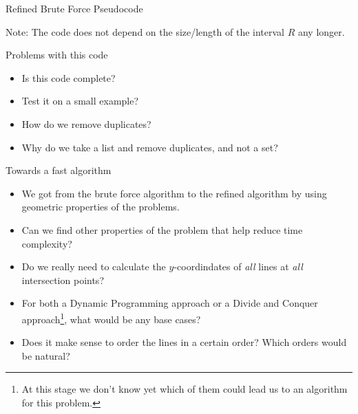 \documentclass[ignorenonframetext,]{beamer}
\begin{document}
\begin{frame}{Refined Brute Force Pseudocode}

\begin{algorithm}[H]
\caption{Refined Brute Force}
\begin{algorithmic}
          
        \EndFor
         
         
        \EndFor
         
    \EndProcedure
\end{algorithmic}
\end{algorithm}
Note: The code does not depend on the size/length of the interval $R$ any longer.
    
\end{frame}

\begin{frame}{Problems with this code}

\begin{itemize}[<+->]
    \item Is this code complete? 
    \item Test it on a small example?
    \item How do we remove duplicates?
    \item Why do we take a list and remove duplicates, and not a set?
\end{itemize}
\end{frame}

    
\begin{frame}{Towards a fast algorithm}

\begin{itemize}[<+->]
    \item We got from the brute force algorithm to the refined algorithm by using geometric properties of the problems.
    \item Can we find other properties of the problem that help reduce time complexity?
    \item Do we really need to calculate the $y$-coordindates of \emph{all} lines at \emph{all} intersection points?
    \item For both a Dynamic Programming approach or a Divide and Conquer approach\footnote{At this stage we don't know yet which of them could lead us to an algorithm for this problem.},
    what would be any base cases?
    \item Does it make sense to order the lines in a certain order? Which orders would be natural?
\end{itemize}
    
\end{frame}
\end{document}

